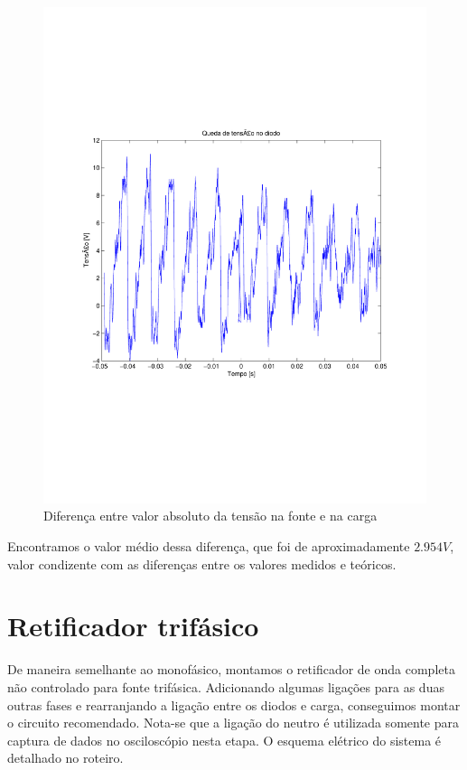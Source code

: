 \documentclass{report}
\begin{document}
\begin{figure}[H]
	\centering
	\includegraphics[width=\linewidth]{dados/monofasico/diff}
	\caption{Diferença entre valor absoluto da tensão na fonte e na carga}
	\label{fig:diff}
\end{figure}

Encontramos o valor médio dessa diferença, que foi de aproximadamente $2.954 V$, valor condizente com as diferenças entre os valores medidos e teóricos.

\section{Retificador trifásico}
De maneira semelhante ao monofásico, montamos o retificador de onda completa não controlado para fonte trifásica. Adicionando algumas ligações para as duas outras fases e rearranjando a ligação entre os diodos e carga, conseguimos montar o circuito recomendado. Nota-se que a ligação do neutro é utilizada somente para captura de dados no osciloscópio nesta etapa. O esquema elétrico do sistema é detalhado no roteiro.
\end{document}
